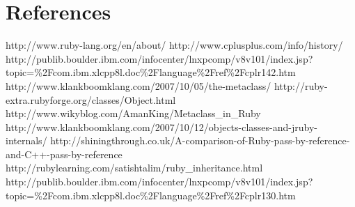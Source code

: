 \documentclass[10pt,a4paper,twocolumn]{article}
\begin{document}
\section{References}
http://www.ruby-lang.org/en/about/
http://www.cplusplus.com/info/history/
http://publib.boulder.ibm.com/infocenter/lnxpcomp/v8v101/index.jsp?topic=\%2Fcom.ibm.xlcpp8l.doc\%2Flanguage\%2Fref\%2Fcplr142.htm
http://www.klankboomklang.com/2007/10/05/the-metaclass/
http://ruby-extra.rubyforge.org/classes/Object.html
http://www.wikyblog.com/AmanKing/Metaclass_in_Ruby
http://www.klankboomklang.com/2007/10/12/objects-classes-and-jruby-internals/
http://shiningthrough.co.uk/A-comparison-of-Ruby-pass-by-reference-and-C++-pass-by-reference
http://rubylearning.com/satishtalim/ruby_inheritance.html
http://publib.boulder.ibm.com/infocenter/lnxpcomp/v8v101/index.jsp?topic=\%2Fcom.ibm.xlcpp8l.doc\%2Flanguage\%2Fref\%2Fcplr130.htm
\end{document}
